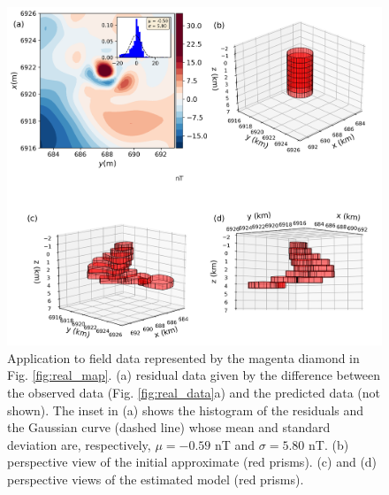 \begin{figure}
	\centering
	\includegraphics[scale=.5]{figures/real_results2.png}
	\caption{Application to field data represented by the magenta diamond in Fig. \ref{fig:real_map}. (a) residual data given by the difference between the observed data (Fig. \ref{fig:real_data}a) and the predicted data (not shown). The inset in (a) shows the histogram of the residuals and the Gaussian curve (dashed line) whose mean and standard deviation are, respectively, $\mu = -0.59$ nT and $\sigma=5.80$ nT. (b) perspective view of the initial approximate (red prisms). (c) and (d) perspective views of the estimated model (red prisms). 
	}
	\label{fig:real_result2}
\end{figure}